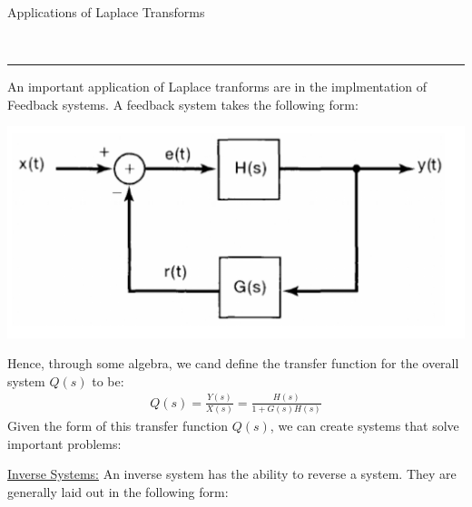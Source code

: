 \documentclass{article}
\newcommand{\sheader}[1]{\underline{#1:}}
\newcommand{\header}[1]{\begin{large}\noindent #1\end{large}\\\rule{\textwidth}{0.5pt}}
\begin{document}
\header{Applications of Laplace Transforms}
An important application of Laplace tranforms are in the implmentation of Feedback systems.
A feedback system takes the following form:
\begin{center}
    \includegraphics[scale=0.15]{feedback-system.jpg}
\end{center}
Hence, through some algebra, we cand define the transfer function for the overall system
$Q(s)$ to be:
\begin{align*}
    Q(s) = \frac{Y(s)}{X(s)} = \frac{H(s)}{1 + G(s)H(s)}
\end{align*}
Given the form of this transfer function $Q(s)$, we can create systems that solve important 
problems:

\pagebreak

\sheader{Inverse Systems} An inverse system has the ability to reverse a system. They 
are generally laid out in the following form:
\end{document}
